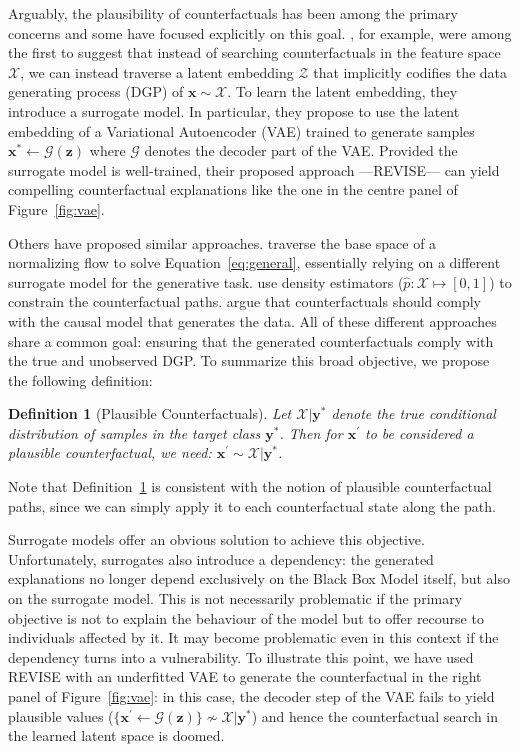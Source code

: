 \documentclass{article}
\newtheorem{definition}{Definition}[section]
\begin{document}
Arguably, the plausibility of counterfactuals has been among the primary concerns and some have focused explicitly on this goal. \citet{joshi2019realistic}, for example, were among the first to suggest that instead of searching counterfactuals in the feature space $\mathcal{X}$, we can instead traverse a latent embedding $\mathcal{Z}$ that implicitly codifies the data generating process (DGP) of $\mathbf{x}\sim\mathcal{X}$. To learn the latent embedding, they introduce a surrogate model. In particular, they propose to use the latent embedding of a Variational Autoencoder (VAE) trained to generate samples $\mathbf{x}^* \leftarrow \mathcal{G}(\mathbf{z})$ where $\mathcal{G}$ denotes the decoder part of the VAE. Provided the surrogate model is well-trained, their proposed approach ---REVISE--- can yield compelling counterfactual explanations like the one in the centre panel of Figure~\ref{fig:vae}. 

Others have proposed similar approaches. \citet{dombrowski2021diffeomorphic} traverse the base space of a normalizing flow to solve Equation~\ref{eq:general}, essentially relying on a different surrogate model for the generative task. \citet{poyiadzi2020face} use density estimators ($\hat{p}: \mathcal{X} \mapsto [0,1]$) to constrain the counterfactual paths. \citet{karimi2021algorithmic} argue that counterfactuals should comply with the causal model that generates the data. All of these different approaches share a common goal: ensuring that the generated counterfactuals comply with the true and unobserved DGP. To summarize this broad objective, we propose the following definition:

\begin{definition}[Plausible Counterfactuals]
  \label{def:plausible}
  Let $\mathcal{X}|\mathbf{y}^*$ denote the true conditional distribution of samples in the target class $\mathbf{y}^*$. Then for $\mathbf{x}^{\prime}$ to be considered a plausible counterfactual, we need: $\mathbf{x}^{\prime} \sim \mathcal{X}|\mathbf{y}^*$.
\end{definition}

Note that Definition~\ref{def:plausible} is consistent with the notion of plausible counterfactual paths, since we can simply apply it to each counterfactual state along the path.

Surrogate models offer an obvious solution to achieve this objective. Unfortunately, surrogates also introduce a dependency: the generated explanations no longer depend exclusively on the Black Box Model itself, but also on the surrogate model. This is not necessarily problematic if the primary objective is not to explain the behaviour of the model but to offer recourse to individuals affected by it. It may become problematic even in this context if the dependency turns into a vulnerability. To illustrate this point, we have used REVISE \citep{joshi2019realistic} with an underfitted VAE to generate the counterfactual in the right panel of Figure~\ref{fig:vae}: in this case, the decoder step of the VAE fails to yield plausible values ($\{\mathbf{x}^{\prime} \leftarrow \mathcal{G}(\mathbf{z})\} \not\sim \mathcal{X}|\mathbf{y}^*$) and hence the counterfactual search in the learned latent space is doomed.
\end{document}
